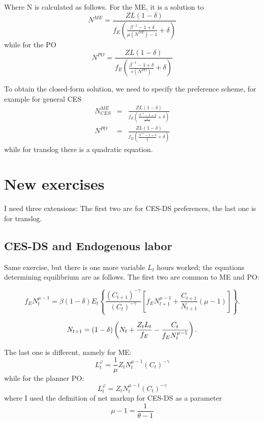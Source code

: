 \documentclass{article}
\begin{document}
Where N is calculated as follows. For the ME, it is a solution to%
\[
N^{ME}=\frac{ZL\left( 1-\delta \right) }{f_{E}\left( \frac{\beta
^{-1}-1+\delta }{\mu \left( N^{NE}\right) -1}+\delta \right) }
\]%
while for the PO%
\[
N^{PO}=\frac{ZL\left( 1-\delta \right) }{f_{E}\left( \frac{\beta
^{-1}-1+\delta }{\epsilon \left( N^{PO}\right) }+\delta \right) }
\]

To obtain the closed-form solution, we need to specify the preference
scheme, for example for general CES%
\begin{eqnarray*}
N_{CES}^{ME} &=&\frac{ZL\left( 1-\delta \right) }{f_{E}\left( \frac{\beta
^{-1}-1+\delta }{\frac{1}{\theta -1}}+\delta \right) } \\
N^{PO} &=&\frac{ZL\left( 1-\delta \right) }{f_{E}\left( \frac{\beta
^{-1}-1+\delta }{\xi }+\delta \right) }
\end{eqnarray*}%
while for translog there is a quadratic equation.

\section{New exercises}

I need three extensions: The first two are for CES-DS preferences, the last
one is for translog.

\subsection{CES-DS and Endogenous labor}

Same exercise, but there is one more variable $L_{t}$ hours worked; the
equations determining equilibrium are as follows. The first two are common
to ME and PO:

\begin{equation}
f_{E}N_{t}^{\mu -1}=\beta \left( 1-\delta \right) E_{t}\left\{ \frac{\left(
C_{t+1}\right) ^{-\gamma }}{\left( C_{t}\right) ^{-\gamma }}\left[
f_{E}N_{t+1}^{\mu -1}+\frac{C_{t+1}}{N_{t+1}}\left( \mu -1\right) \right]
\right\} .
\end{equation}

\begin{equation}
N_{t+1}=\left( 1-\delta \right) \left( N_{t}+\frac{Z_{t}L_{t}}{f_{E}}-\frac{%
C_{t}}{f_{E}N_{t}^{\mu -1}}\right) .
\end{equation}

The last one is different, namely for ME:%
\begin{equation}
L_{t}^{\varphi }=\frac{1}{\mu }Z_{t}N_{t}^{\mu -1}\left( C_{t}\right)
^{-\gamma }  \label{LS}
\end{equation}%
while for the planner PO:%
\begin{equation}
L_{t}^{\varphi }=Z_{t}N_{t}^{\mu -1}\left( C_{t}\right) ^{-\gamma }
\label{plannerLS}
\end{equation}%
where I used the definition of net markup for CES-DS as a parameter 
\[
\allowbreak \mu -1=\frac{1}{\theta -1}
\]
\end{document}
